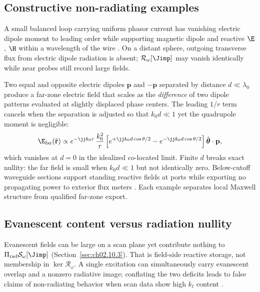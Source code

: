 \subsection{Constructive non-radiating examples}
\label{sec:ch02.8.2}

A small balanced loop carrying uniform phasor current has vanishing electric dipole moment to leading order while supporting magnetic dipole and reactive $\E$, $\H$ within a wavelength of the wire \cite{stratton1941,jackson1999}. On a distant sphere, outgoing transverse flux from electric dipole radiation is absent; $\mathcal{R}_\omega[\Jimp]$ may vanish identically while near probes still record large fields.

Two equal and opposite electric dipoles $\mathbf{p}$ and $-\mathbf{p}$ separated by distance $d\ll\lambda_0$ produce a far-zone electric field that scales as the \emph{difference} of two dipole patterns evaluated at slightly displaced phase centers. The leading $1/r$ term cancels when the separation is adjusted so that $k_0 d\ll1$ yet the quadrupole moment is negligible:
\begin{equation}
\label{eq:ch2.counter-dipole-cancel}
\E_{\mathrm{far}}(\hat{\mathbf{r}})\propto
e^{-\jj k_0 r}\,\frac{k_0^2}{r}\,
\Big[e^{+\jj k_0 d\cos\theta/2}-e^{-\jj k_0 d\cos\theta/2}\Big]\,\hat{\boldsymbol\theta}\cdot\mathbf{p},
\end{equation}
which vanishes at $d=0$ in the idealized co-located limit. Finite $d$ breaks exact nullity: the far field is small when $k_0 d\ll1$ but not identically zero. Below-cutoff waveguide sections support standing reactive fields at ports while exporting no propagating power to exterior flux meters \cite{stratton1941}. Each example separates local Maxwell structure from qualified far-zone export.

\subsection{Evanescent content versus radiation nullity}
\label{sec:ch02.8.3}

Evanescent fields can be large on a scan plane yet contribute nothing to $\Pi_{\mathrm{rad}}\mathcal{S}_\omega[\Jimp]$ (Section~\ref{sec:ch02.10.3}). That is field-side reactive storage, not membership in $\ker\mathcal{R}_\omega$. A single excitation can simultaneously carry evanescent overlap and a nonzero radiative image; conflating the two deficits leads to false claims of non-radiating behavior when scan data show high $k_t$ content \cite{hansen1988,devaney2004}.

